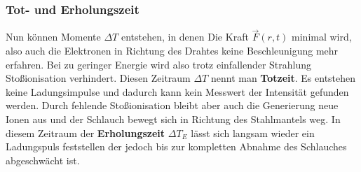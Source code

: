 \subsubsection{Tot- und Erholungszeit}
Nun können Momente $\Delta T$ entstehen, in denen Die Kraft $\vec{F}(r,t)$ minimal wird, also auch die Elektronen in Richtung des Drahtes keine Beschleunigung mehr erfahren. 
Bei zu geringer Energie wird also trotz einfallender Strahlung Stoßionisation verhindert. Diesen Zeitraum $\Delta T$ nennt man \textbf{Totzeit}. Es entstehen keine Ladungsimpulse und dadurch kann kein Messwert der Intensität gefunden werden.
Durch fehlende Stoßionisation bleibt aber auch die Generierung neue Ionen aus und der Schlauch bewegt sich in Richtung des Stahlmantels weg. 
In diesem Zeitraum der \textbf{Erholungszeit} $\Delta T_E$ lässt sich langsam wieder ein Ladungspuls feststellen der jedoch bis zur kompletten Abnahme des Schlauches abgeschwächt ist.

